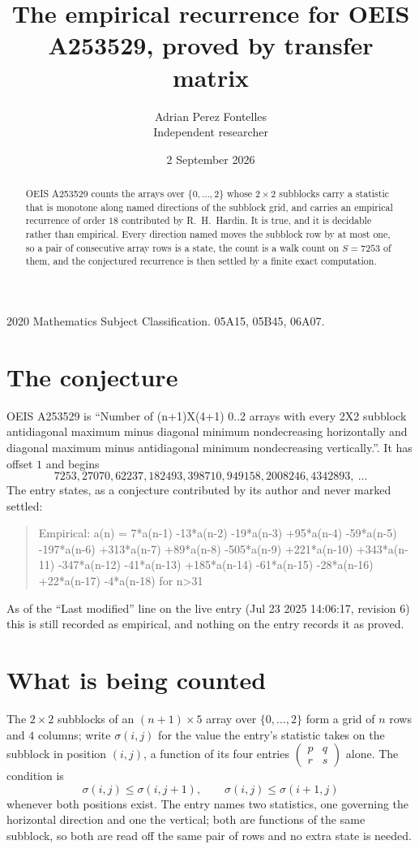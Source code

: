 \documentclass[11pt,a4paper]{article}
\title{The empirical recurrence for OEIS A253529, proved by transfer matrix}
\author{Adrian Perez Fontelles\\ \small Independent researcher}
\date{2 September 2026}
\theoremstyle{plain}
\theoremstyle{definition}
\begin{document}
\maketitle

\begin{abstract}
OEIS A253529 counts the arrays over $\{0,\dots,2\}$ whose $2\times2$ subblocks carry a
statistic that is monotone along named directions of the subblock grid, and carries an
empirical recurrence of order $18$ contributed by R.~H.~Hardin. It is true, and it is
decidable rather than empirical. Every direction named moves the subblock row by at most one,
so a pair of consecutive array rows is a state, the count is a walk count on $S=7253$ of them,
and the conjectured recurrence is then settled by a finite exact computation.
\end{abstract}

\noindent\small 2020 Mathematics Subject Classification. 05A15, 05B45, 06A07.\normalsize

\section{The conjecture}

OEIS A253529 is ``Number of (n+1)X(4+1) 0..2 arrays with every 2X2 subblock antidiagonal maximum minus diagonal minimum nondecreasing horizontally and diagonal maximum minus antidiagonal minimum nondecreasing vertically.''. It has offset $1$ and begins
\[
7253, 27070, 62237, 182493, 398710, 949158, 2008246, 4342893,\ \dots
\]
The entry states, as a conjecture contributed by its author and never marked settled:
\begin{quote}
Empirical: a(n) = 7*a(n-1) -13*a(n-2) -19*a(n-3) +95*a(n-4) -59*a(n-5) -197*a(n-6) +313*a(n-7) +89*a(n-8) -505*a(n-9) +221*a(n-10) +343*a(n-11) -347*a(n-12) -41*a(n-13) +185*a(n-14) -61*a(n-15) -28*a(n-16) +22*a(n-17) -4*a(n-18) for n>31
\end{quote}
As of the ``Last modified'' line on the live entry (Jul 23 2025 14:06:17, revision 6) this is still
recorded as empirical, and nothing on the entry records it as proved.

\section{What is being counted}

The $2\times2$ subblocks of an $(n+1)\times5$ array over $\{0,\dots,2\}$ form a grid
of $n$ rows and $4$ columns; write $\sigma(i,j)$ for the value the entry's statistic takes on
the subblock in position $(i,j)$, a function of its four entries
$\begin{pmatrix}p&q\\r&s\end{pmatrix}$ alone. The condition is
\[
\sigma(i,j)\le\sigma(i,j+1),\qquad \sigma(i,j)\le\sigma(i+1,j)
\]
whenever both positions exist. The entry names two statistics, one governing the horizontal direction and one the vertical; both are functions of the same subblock, so both are read off the same pair of rows and no extra state is needed.
\end{document}
